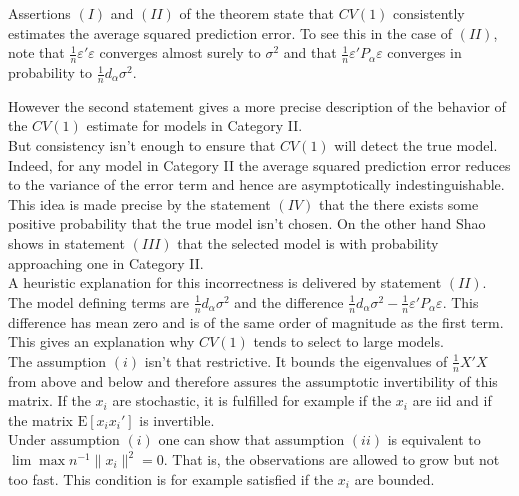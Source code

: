 \documentclass[Research_Module_ES.tex]{subfiles}
\begin{document}
Assertions $(I)$ and $(II)$ of the theorem state that $CV(1)$ consistently estimates the average squared prediction error. To see this in the case of $(II)$, note that $\frac{1}{n}\varepsilon'\varepsilon$ converges almost surely to $\sigma^2$ and that 
$\frac{1}{n}\varepsilon'P_\alpha\varepsilon$ converges in probability to $\frac{1}{n}d_\alpha\sigma^2$.\

However the second statement gives a more precise description of the behavior of the $CV(1)$ estimate for models in Category II. \\

But consistency isn't enough to ensure that $CV(1)$ will detect the true model. 
Indeed, for any model in Category II the average squared prediction error reduces to the variance of the error term and hence are asymptotically indestinguishable. 
This idea is made precise by the statement $(IV)$ that the there exists some positive probability that the true model isn't chosen. On the other hand Shao shows in statement $(III)$ that the selected model is with probability approaching one in Category II.\\

A heuristic explanation for this incorrectness is delivered by statement $(II)$. The model defining terms are $\frac{1}{n}d_\alpha\sigma^2$ and the difference $\frac{1}{n}d_\alpha\sigma^2 - \frac{1}{n}\varepsilon'P_\alpha\varepsilon$. This difference has mean zero and is of the same order of magnitude as the first term. This gives an explanation why $CV(1)$ tends to select to large models.\\

The assumption $(i)$ isn't that restrictive. It bounds the eigenvalues of $\frac{1}{n}X'X$ from above and below and therefore assures the assumptotic invertibility of this matrix. If the $x_i$ are stochastic, it is fulfilled for example if the $x_i$ are iid and if the matrix $\mathrm{E}[x_ix_i']$ is invertible.\\

Under assumption $(i)$ one can show that assumption $(ii)$ is equivalent to 
$\lim \max n^{-1}\lVert x_i\rVert^2=0$. That is, the observations are allowed to grow but not too fast. This condition is for example satisfied if the $x_i$ are bounded.
\end{document}

